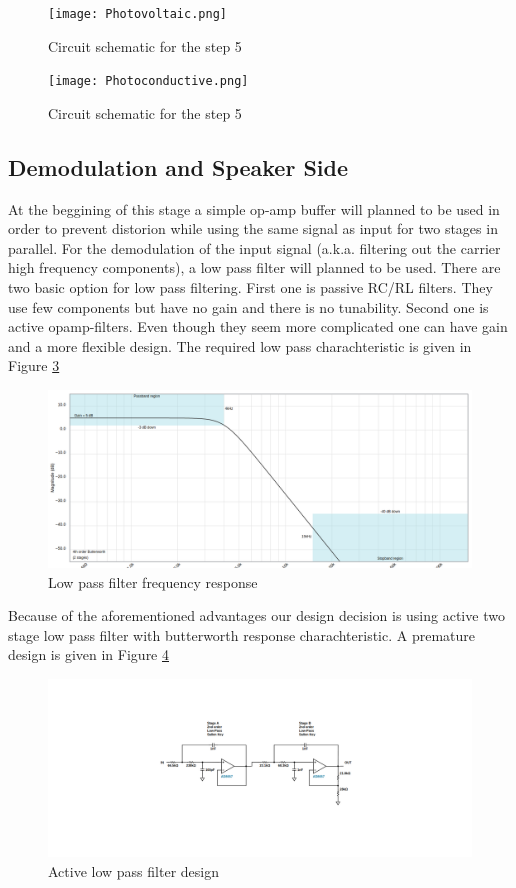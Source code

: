 \documentclass[a4paper,10pt]{IEEEtran}
\begin{document}
\begin{figure}[H]
    \centering
    \texttt{[image: Photovoltaic.png]}
    \caption{Circuit schematic for the step 5}
    \label{photovoltaic}
    \end{figure} 

\begin{figure}[H]
    \centering
    \texttt{[image: Photoconductive.png]}
    \caption{Circuit schematic for the step 5}
    \label{photoconductive}
    \end{figure} 
                




\subsection{Demodulation and Speaker Side}
At the beggining of this stage a simple op-amp buffer will planned to be used in order to prevent distorion while using the same signal as input for two stages in parallel. For the demodulation of the input signal (a.k.a. filtering out the carrier high frequency components), a low pass filter will planned to be used. There are two basic  option for low pass filtering. First one is passive RC/RL filters. They use few components but have no gain and there is no tunability. Second one is active opamp-filters. Even though they seem more complicated one can have gain and a more flexible design. The required low pass charachteristic is given in Figure \ref*{low_pass_plot}
\begin{figure}[H]
    \centering
    \includegraphics[width = 0.75\linewidth]{active_low_pass.png}
    \caption{Low pass filter frequency response}
    \label{low_pass_plot}    
\end{figure} 
Because of the aforementioned advantages our design decision is using active two stage low pass filter with butterworth response charachteristic. A premature design is given in Figure \ref*{low_pass_sch}
\begin{figure}[H]
    \centering
    \includegraphics[width = 0.75\linewidth]{active_low_pass_circuit.png}
    \caption{Active low pass filter design}
    \label{low_pass_sch}    
\end{figure} 
\end{document}
